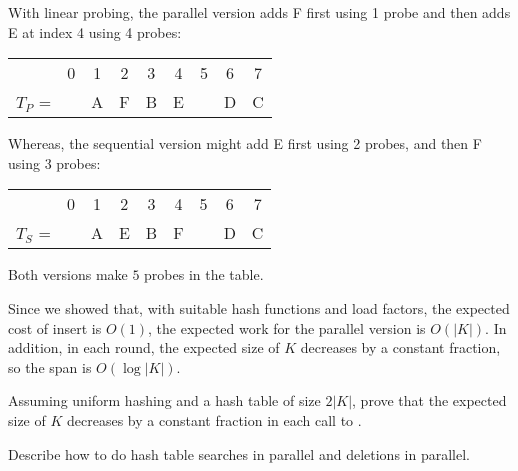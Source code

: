 \begin{example}
With linear probing, the parallel version adds F first using 1 probe
and then adds E at index 4 using 4 probes:
\begin{center}
\begin{tabular}{l c c c c c c c c }
      & 0 & 1 & 2 & 3 & 4 & 5 & 6 & 7 \\ \cline{2-9}
  $T_P$ = &   & A & F & B & E &   & D & C \\\cline{2-9}
\end{tabular}
\end{center}
Whereas, the sequential version might add E first using 2 probes,
and then F using 3 probes:
\begin{center}
\begin{tabular}{l c c c c c c c c }
      & 0 & 1 & 2 & 3 & 4 & 5 & 6 & 7 \\ \cline{2-9}
  $T_S$ = &   & A & E & B & F &   & D & C \\\cline{2-9}
\end{tabular}
\end{center}
Both versions make $5$ probes in the table. 
\end{example}

Since we showed that, with suitable hash functions and load factors,
the expected cost of insert is $O(1)$, the expected work for the
parallel version is $O(|K|)$.  In addition, in each round, the
expected size of $K$ decreases by a constant fraction, so the span is
$O(\log |K|)$.

\begin{exercise}
Assuming uniform hashing and a hash table of size $2|K|$, prove that
the expected size of $K$ decreases by a constant fraction in each call
to .
\end{exercise}

\begin{exercise}
Describe how to do hash table searches in parallel and deletions in
parallel.
\end{exercise}


